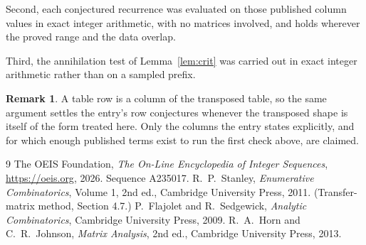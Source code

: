 \documentclass[11pt,a4paper]{article}
\theoremstyle{plain}
\theoremstyle{definition}
\newtheorem{remark}[theorem]{Remark}
\begin{document}
Second, each conjectured recurrence was evaluated on those published column values in exact
integer arithmetic, with no matrices involved, and holds wherever the proved range and the
data overlap.

Third, the annihilation test of Lemma~\ref{lem:crit} was carried out in exact integer
arithmetic rather than on a sampled prefix.

\begin{remark}
A table row is a column of the transposed table, so the same argument settles the entry's row
conjectures whenever the transposed shape is itself of the form treated here. Only the columns
the entry states explicitly, and for which enough published terms exist to run the first check
above, are claimed.
\end{remark}

\begin{thebibliography}{9}
 The OEIS Foundation, \emph{The On-Line Encyclopedia of Integer
Sequences}, \url{https://oeis.org}, 2026. Sequence A235017.
 R.~P.~Stanley, \emph{Enumerative Combinatorics}, Volume 1, 2nd ed.,
Cambridge University Press, 2011. (Transfer-matrix method, Section 4.7.)
 P.~Flajolet and R.~Sedgewick, \emph{Analytic Combinatorics}, Cambridge
University Press, 2009.
 R.~A.~Horn and C.~R.~Johnson, \emph{Matrix Analysis}, 2nd ed., Cambridge
University Press, 2013.
\end{thebibliography}
\end{document}
